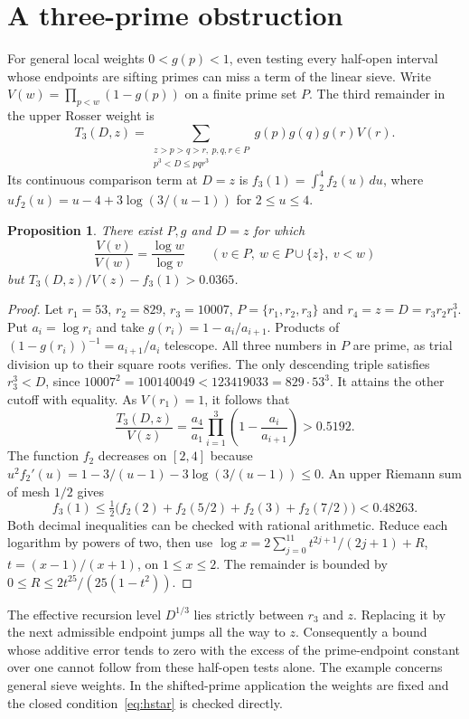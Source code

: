 \documentclass[11pt]{article}
\newtheorem{proposition}[theorem]{Proposition}
\theoremstyle{remark}\newtheorem{remark}[theorem]{Remark}
\begin{document}
\section{A three-prime obstruction}\label{sec:threeprimes}

For general local weights $0<g(p)<1$, even testing every half-open interval whose endpoints are sifting primes can miss a term of the linear sieve. Write $V(w)=\prod_{p<w}(1-g(p))$ on a finite prime set $P$. The third remainder in the upper Rosser weight is
\[
 T_3(D,z)=\sum_{\substack{z>p>q>r,\ p,q,r\in P\\
                  p^3<D\le pqr^3}}
                   g(p)g(q)g(r)V(r).
\]
Its continuous comparison term at $D=z$ is $f_3(1)=\int_2^4 f_2(u)\,du$, where
$u f_2(u)=u-4+3\log(3/(u-1))$ for $2\le u\le4$.

\begin{proposition}\label{prop:threeprimes}
There exist $P,g$ and $D=z$ for which
\[
 \frac{V(v)}{V(w)}=\frac{\log w}{\log v}
 \qquad(v\in P,\ w\in P\cup\{z\},\ v<w)
\]
but $T_3(D,z)/V(z)-f_3(1)>0.0365$.
\end{proposition}
\begin{proof}
Let $r_1=53$, $r_2=829$, $r_3=10007$, $P=\{r_1,r_2,r_3\}$ and
$r_4=z=D=r_3 r_2 r_1^3$. Put $a_i=\log r_i$ and take $g(r_i)=1-a_i/a_{i+1}$. Products of $(1-g(r_i))^{-1}=a_{i+1}/a_i$ telescope. All three numbers in $P$ are prime, as trial division up to their square roots verifies. The only descending triple satisfies $r_3^3<D$, since $10007^2=100140049<123419033=829\cdot53^3$. It attains the other cutoff with equality. As $V(r_1)=1$, it follows that
\[
 \frac{T_3(D,z)}{V(z)}
   =\frac{a_4}{a_1}\prod_{i=1}^3\left(1-\frac{a_i}{a_{i+1}}\right)
   >0.5192 .
\]
The function $f_2$ decreases on $[2,4]$ because $u^2f_2'(u)=1-3/(u-1)-3\log(3/(u-1))\le0$. An upper Riemann sum of mesh $1/2$ gives
\[
 f_3(1)\le\tfrac12\bigl(f_2(2)+f_2(5/2)+f_2(3)+f_2(7/2)\bigr)<0.48263 .
\]
Both decimal inequalities can be checked with rational arithmetic. Reduce each logarithm by powers of two, then use $\log x=2\sum_{j=0}^{11}t^{2j+1}/(2j+1)+R$, $t=(x-1)/(x+1)$, on $1\le x\le2$. The remainder is bounded by $0\le R\le 2t^{25}/(25(1-t^2))$.
\end{proof}

The effective recursion level $D^{1/3}$ lies strictly between $r_3$ and $z$. Replacing it by the next admissible endpoint jumps all the way to $z$. Consequently a bound whose additive error tends to zero with the excess of the prime-endpoint constant over one cannot follow from these half-open tests alone. The example concerns general sieve weights. In the shifted-prime application the weights are fixed and the closed condition~\eqref{eq:hstar} is checked directly.
\end{document}
